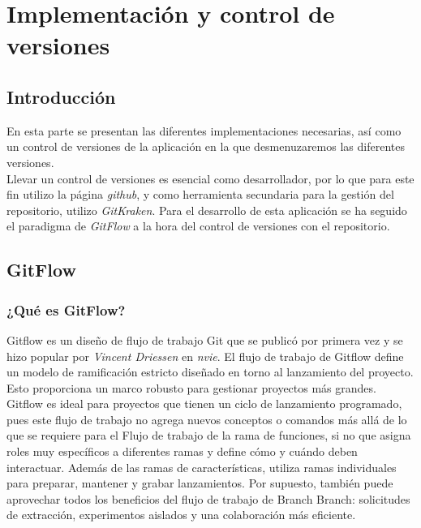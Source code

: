\section{Implementación y control de versiones}

\subsection{Introducción}

\quad En esta parte se presentan las diferentes implementaciones necesarias, así como un control de versiones de la aplicación en la que desmenuzaremos las diferentes versiones. \\

\quad Llevar un control de versiones es esencial como desarrollador, por lo que para este fin utilizo la página \textit{github}, y como herramienta secundaria para la gestión del repositorio, utilizo \textit{GitKraken}. Para el desarrollo de esta aplicación se ha seguido el paradigma de \textit{GitFlow} a la hora del control de versiones con el repositorio.\\
 
\subsection{GitFlow}
\subsubsection{¿Qué es GitFlow?}

\quad Gitflow es un diseño de flujo de trabajo Git que se publicó por primera vez y se hizo popular por \textit{Vincent Driessen} en \textit{nvie}. El flujo de trabajo de Gitflow define un modelo de ramificación estricto diseñado en torno al lanzamiento del proyecto. Esto proporciona un marco robusto para gestionar proyectos más grandes.\\

\quad Gitflow es ideal para proyectos que tienen un ciclo de lanzamiento programado, pues este flujo de trabajo no agrega nuevos conceptos o comandos más allá de lo que se requiere para el Flujo de trabajo de la rama de funciones, si no que asigna roles muy específicos a diferentes ramas y define cómo y cuándo deben interactuar. Además de las ramas de características, utiliza ramas individuales para preparar, mantener y grabar lanzamientos. Por supuesto, también puede aprovechar todos los beneficios del flujo de trabajo de Branch Branch: solicitudes de extracción, experimentos aislados y una colaboración más eficiente.\\ 

